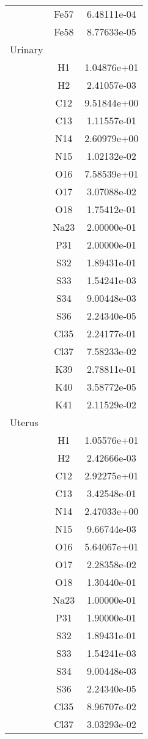 \begin{centering}
\begin{longtable}{l c c}
& Fe57 & 6.48111e-04 \\ 
& Fe58 & 8.77633e-05 \\ 
\hline
Urinary & & \\
\hline
& H1 & 1.04876e+01 \\ 
& H2 & 2.41057e-03 \\ 
& C12 & 9.51844e+00 \\ 
& C13 & 1.11557e-01 \\ 
& N14 & 2.60979e+00 \\ 
& N15 & 1.02132e-02 \\ 
& O16 & 7.58539e+01 \\ 
& O17 & 3.07088e-02 \\ 
& O18 & 1.75412e-01 \\ 
& Na23 & 2.00000e-01 \\ 
& P31 & 2.00000e-01 \\ 
& S32 & 1.89431e-01 \\ 
& S33 & 1.54241e-03 \\ 
& S34 & 9.00448e-03 \\ 
& S36 & 2.24340e-05 \\ 
& Cl35 & 2.24177e-01 \\ 
& Cl37 & 7.58233e-02 \\ 
& K39 & 2.78811e-01 \\ 
& K40 & 3.58772e-05 \\ 
& K41 & 2.11529e-02 \\ 
\hline
Uterus & & \\
\hline
& H1 & 1.05576e+01 \\ 
& H2 & 2.42666e-03 \\ 
& C12 & 2.92275e+01 \\ 
& C13 & 3.42548e-01 \\ 
& N14 & 2.47033e+00 \\ 
& N15 & 9.66744e-03 \\ 
& O16 & 5.64067e+01 \\ 
& O17 & 2.28358e-02 \\ 
& O18 & 1.30440e-01 \\ 
& Na23 & 1.00000e-01 \\ 
& P31 & 1.90000e-01 \\ 
& S32 & 1.89431e-01 \\ 
& S33 & 1.54241e-03 \\ 
& S34 & 9.00448e-03 \\ 
& S36 & 2.24340e-05 \\ 
& Cl35 & 8.96707e-02 \\ 
& Cl37 & 3.03293e-02 \\ 

\end{longtable}
\end{centering}
